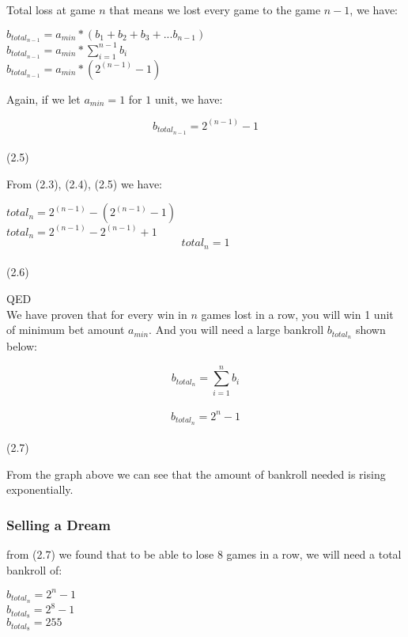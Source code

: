 \documentclass{article}
\begin{document}
Total loss at game $n$ that means we lost every game to the game $n-1$, we have:\par
\begin{center}
$b_{total_{n-1}} = a_{min} * (b_1+b_2+b_3+...b_{n-1})$\\
$b_{total_{n-1}} = a_{min} * \sum^{n-1}_{i=1}b_i$\\
$b_{total_{n-1}} = a_{min} * (2^{(n-1)}-1)$\\
\end{center}
Again, if we let $a_{min}=1$ for $1$ unit, we have:
\begin{center}
$$b_{total_{n-1}} = 2^{(n-1)}-1$$\\(2.5)\\
\end{center}
From (2.3), (2.4), (2.5) we have:\\

\begin{center}
	$total_n = 2^{(n-1)}-(2^{(n-1)}-1)$\\
	$total_n = 2^{(n-1)}-2^{(n-1)}+1$\\
	$$total_n = 1$$\\(2.6)\\
\end{center}
QED\\

We have proven that for every win in $n$ games lost in a row, you will win 1 unit of minimum bet amount $a_{min}$. And you will need a large bankroll $b_{total_n}$ shown below:\\
\begin{center}
$$b_{total_n}=\sum^n_{i=1}b_i$$\\
$$b_{total_n}={2^n}-1$$\\(2.7)
\end{center}
\begin{center}
\end{center}

From the graph above we can see that the amount of bankroll needed is rising exponentially.  

\subsubsection{Selling a Dream}
from (2.7) we found that to be able to lose 8 games in a row, we will need a total bankroll of:\par
\begin{center}
$b_{total_n}={2^n}-1$\\
$b_{total_8}={2^8}-1$\\
$b_{total_8}=255$\\
\end{center}
\end{document}
